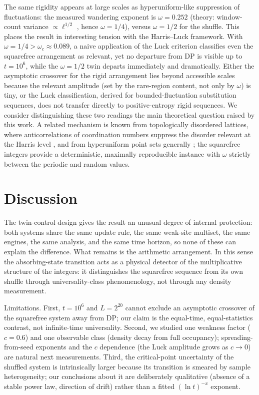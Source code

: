 \documentclass[aps,pre,twocolumn,superscriptaddress,nofootinbib]{revtex4-2}
\begin{document}
The same rigidity appears at large scales as hyperuniform-like suppression of fluctuations:
the measured wandering exponent is $\omega = 0.252$ (theory: window-count variance
$\propto \ell^{1/2}$ \cite{Hall1982}, hence $\omega = 1/4$), versus $\omega = 1/2$ for the
shuffle. This places the result in interesting tension with the Harris--Luck framework.
With $\omega = 1/4 > \omega_c \approx 0.089$, a naive application of the Luck criterion
classifies even the squarefree arrangement as relevant, yet no departure from DP is visible
up to $t=10^6$, while the $\omega = 1/2$ twin departs immediately and dramatically. Either
the asymptotic crossover for the rigid arrangement lies beyond accessible scales because the
relevant amplitude (set by the rare-region content, not only by $\omega$) is tiny, or the
Luck classification, derived for bounded-fluctuation substitution sequences, does not
transfer directly to positive-entropy rigid sequences. We consider distinguishing these two
readings the main theoretical question raised by this work. A related mechanism is known
from topologically disordered lattices, where anticorrelations of coordination numbers
suppress the disorder relevant at the Harris level \cite{BarghathiVojta2014}, and from
hyperuniform point sets generally \cite{TorquatoStillinger2003}; the squarefree integers
provide a deterministic, maximally reproducible instance with $\omega$ strictly between the
periodic and random values.

\section{Discussion}

The twin-control design gives the result an unusual degree of internal protection: both
systems share the same update rule, the same weak-site multiset, the same engines, the same
analysis, and the same time horizon, so none of these can explain the difference. What
remains is the arithmetic arrangement. In this sense the absorbing-state transition acts as
a physical detector of the multiplicative structure of the integers: it distinguishes the
squarefree sequence from its own shuffle through universality-class phenomenology, not
through any density measurement.

Limitations. First, $t = 10^6$ and $L = 2^{20}$ cannot exclude an asymptotic crossover of
the squarefree system away from DP; our claim is the equal-time, equal-statistics contrast,
not infinite-time universality. Second, we studied one weakness factor ($c=0.6$) and one
observable class (density decay from full occupancy); spreading-from-seed exponents and the
$c$ dependence (the Luck amplitude grows as $c \to 0$) are natural next measurements. Third,
the critical-point uncertainty of the shuffled system is intrinsically larger because its
transition is smeared by sample heterogeneity; our conclusions about it are deliberately
qualitative (absence of a stable power law, direction of drift) rather than a fitted
$(\ln t)^{-x}$ exponent.
\end{document}
